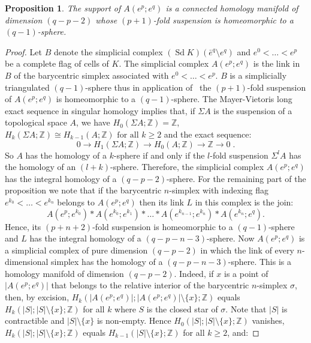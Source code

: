 \documentclass[10pt]{amsart}
\newtheorem{prop}[theo]{Proposition}
\theoremstyle{definition}
\numberwithin{equation}{section}
\numberwithin{figure}{section}
\newcommand{\Z}{\mathbb{Z}}
\DeclareMathOperator{\Sd}{Sd}
\begin{document}
\begin{prop}\label{prp:A_homo}
The support of $A(e^p;e^q)$ is a connected homology manifold of dimension $(q-p-2)$ whose $(p+1)$-fold suspension is homeomorphic to a $(q-1)$-sphere.
\end{prop}

\begin{proof}
Let $B$ denote the simplicial complex $(\Sd K)(\bar{e}^q\setminus e^q)$ and $e^0<\dots<e^p$ be a complete flag of cells of $K$. The simplicial complex $A(e^p;e^q)$ is the link in $B$ of the barycentric simplex associated with $e^0<\dots<e^p$. $B$ is a simplicially triangulated $(q-1)$-sphere thus in application of~\cite[Proposition~1.3 p.~5]{Gal-Ste_Cla_Sim} the $(p+1)$-fold suspension of $A(e^p;e^q)$ is homeomorphic to a $(q-1)$-sphere. The Mayer-Vietoris long exact sequence in singular homology implies that, if $\Sigma A$ is the suspension of a topological space $A$, we have $H_0(\Sigma A;\Z)=\Z$, $H_{k}(\Sigma A;\Z)\cong H_{k-1}(A;\Z) \text{ for all }k\geq 2$ and the exact sequence:
\begin{equation*}
0 \rightarrow H_1(\Sigma A;\Z) \rightarrow H_0(A;\Z) \rightarrow \Z \rightarrow 0\;.
\end{equation*}
So $A$ has the homology of a $k$-sphere if and only if the $l$-fold suspension $\Sigma^l A$ has the homology of an $(l+k)$-sphere. Therefore, the simplicial complex $A(e^p;e^q)$ has the integral homology of a $(q-p-2)$-sphere. For the remaining part of the proposition we note that if the barycentric $n$-simplex with indexing flag $e^{k_0}<\dots<e^{k_{n}}$ belongs to $A(e^p;e^q)$ then its link $L$ in this complex is the join:
\begin{equation*}
A\left(e^p;e^{k_0}\right)*A\left(e^{k_0};e^{k_1}\right)*\dots*A\left(e^{k_{n-1}};e^{k_n}\right)*A\left(e^{k_n};e^{q}\right).
\end{equation*}
Hence, its $(p+n+2)$-fold suspension is homeomorphic to a $(q-1)$-sphere and $L$ has the integral homology of a $(q-p-n-3)$-sphere. Now $A(e^p;e^q)$ is a simplicial complex of pure dimension $(q-p-2)$ in which the link of every $n$-dimensional simplex has the homology of a $(q-p-n-3)$-sphere. This is a homology manifold of dimension $(q-p-2)$. Indeed, if $x$ is a point of $|A(e^p;e^q)|$ that belongs to the relative interior of the barycentric $n$-simplex $\sigma$, then, by excision, $H_k(|A(e^p;e^q)|;|A(e^p;e^q)|\setminus\{x\};\Z)$ equals $H_k(|S|;|S|\setminus\{x\};\Z)$ for all $k$ where $S$ is the closed star of $\sigma$. Note that $|S|$ is contractible and $|S|\setminus\{x\}$ is non-empty. Hence $H_0(|S|;|S|\setminus\{x\};\Z)$ vanishes, $H_k(|S|;|S|\setminus\{x\};\Z)$ equals $H_{k-1}(|S|\setminus\{x\};\Z)$ for all $k\geq2$, and:

\end{proof}
\end{document}
